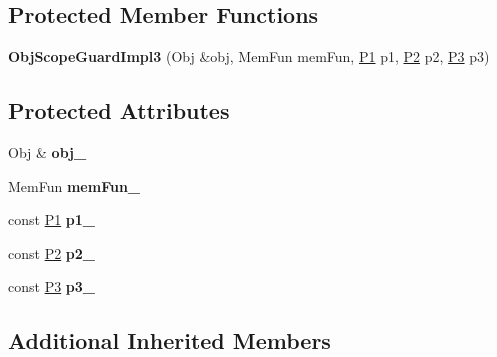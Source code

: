 \subsection*{Protected Member Functions}
\begin{DoxyCompactItemize}
\item 
\hypertarget{classLoki_1_1ObjScopeGuardImpl3_a6c29b38c1f99225bfa31fe8d485dea43}{}{\bfseries Obj\+Scope\+Guard\+Impl3} (Obj \&obj, Mem\+Fun mem\+Fun, \hyperlink{structP1}{P1} p1, \hyperlink{structP2}{P2} p2, \hyperlink{structP3}{P3} p3)\label{classLoki_1_1ObjScopeGuardImpl3_a6c29b38c1f99225bfa31fe8d485dea43}

\end{DoxyCompactItemize}
\subsection*{Protected Attributes}
\begin{DoxyCompactItemize}
\item 
\hypertarget{classLoki_1_1ObjScopeGuardImpl3_a6701680612a8880b8f32168625bad6ef}{}Obj \& {\bfseries obj\+\_\+}\label{classLoki_1_1ObjScopeGuardImpl3_a6701680612a8880b8f32168625bad6ef}

\item 
\hypertarget{classLoki_1_1ObjScopeGuardImpl3_a195a55e33fdac1b29cee8aef56ffa039}{}Mem\+Fun {\bfseries mem\+Fun\+\_\+}\label{classLoki_1_1ObjScopeGuardImpl3_a195a55e33fdac1b29cee8aef56ffa039}

\item 
\hypertarget{classLoki_1_1ObjScopeGuardImpl3_a9d42acb192e2692cefe56f0e3d7f1eee}{}const \hyperlink{structP1}{P1} {\bfseries p1\+\_\+}\label{classLoki_1_1ObjScopeGuardImpl3_a9d42acb192e2692cefe56f0e3d7f1eee}

\item 
\hypertarget{classLoki_1_1ObjScopeGuardImpl3_ae8be97b576e51ddf82808a5431a600f0}{}const \hyperlink{structP2}{P2} {\bfseries p2\+\_\+}\label{classLoki_1_1ObjScopeGuardImpl3_ae8be97b576e51ddf82808a5431a600f0}

\item 
\hypertarget{classLoki_1_1ObjScopeGuardImpl3_a2bf58ca0fc0bda75a769a3d6d4b60998}{}const \hyperlink{structP3}{P3} {\bfseries p3\+\_\+}\label{classLoki_1_1ObjScopeGuardImpl3_a2bf58ca0fc0bda75a769a3d6d4b60998}

\end{DoxyCompactItemize}
\subsection*{Additional Inherited Members}


